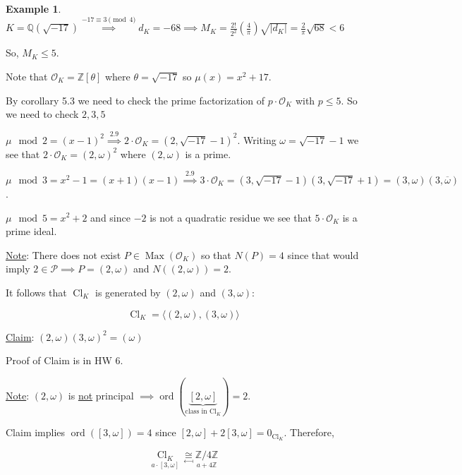 \documentclass[openany]{amsbook}
\numberwithin{section}{chapter}
\theoremstyle{definition}
\newtheorem*{example}{Example}
\begin{document}
\begin{example}
    \(K = \mathbb{Q}(\sqrt{-17}) \overset{-17 \equiv 3\pmod 4}{\implies} d_K = -68 \implies M_K = \frac{2!}{2^2} \left( \frac{4}{\pi} \right) \sqrt{\vert d_K \vert } = \frac{2}{\pi }\sqrt{68} < 6 \) 

    So, \(M_K \leq 5\). 

    Note that \(\mathcal{O}_K = \mathbb{Z} [\theta]\) where \(\theta = \sqrt{-17}\) so \(\mu(x) = x^2 + 17\). 
    
    By corollary 5.3 we need to check the prime factorization of \(p\cdot \mathcal{O}_K\) with \(p \leq 5\). So we need to check \(2,3,5\) 
    
    \(\mu \mod 2 = (x-1)^2 \overset{2.9}{\implies} 2\cdot \mathcal{O}_K = (2,\sqrt{-17}-1)^2\). Writing \(\omega = \sqrt{-17} - 1\) we see that \(2\cdot \mathcal{O}_K = (2,\omega)^2\) where \((2,\omega)\) is a prime.
    
    \(\mu \mod 3 = x^2 - 1 = (x+1)(x-1) \overset{2.9}{\implies} 3\cdot \mathcal{O}_K = (3,\sqrt{-17}-1)(3,\sqrt{-17}+1) = (3,\omega)(3,\overline{\omega})\).
    
    \(\mu \mod 5 = x^2 + 2\) and since \(-2\) is not a quadratic residue we see that \(5\cdot \mathcal{O}_K\) is a prime ideal. 

    \underline{Note}: There does not exist \(P\in \operatorname{Max}(\mathcal{O}_K)\) so that \(N(P)=4\) since that would imply \(2\in \mathcal{P} \implies P = (2,\omega)\) and \(N((2,\omega)) = 2\).  

    It follows that \(\operatorname{Cl}_K\) is generated by \((2,\omega)\) and \((3,\omega)\):

    \[
        \operatorname{Cl}_K = \langle (2,\omega), (3,\omega) \rangle 
    \]

    \underline{Claim}: \((2,\omega)(3,\omega)^2 = (\omega)\)
    
    Proof of Claim is in HW 6.

    \underline{Note}: \((2,\omega)\) is \underline{not} principal \(\implies \operatorname{ord}(\underbrace{[2,\omega]}_{\text{class in }\operatorname{Cl}_K}) = 2\).

    Claim implies \(\operatorname{ord}([3,\omega]) = 4\) since \([2,\omega] + 2 [3,\omega] = 0_{\operatorname{Cl}_K}\). Therefore,

    \[
        \underset{a\cdot [3,\omega]}{\operatorname{Cl}_K} \underset{\mapsfrom}{\cong} \underset{a + 4\mathbb{Z}}{\mathbb{Z} / 4\mathbb{Z}}  
    \]

\end{example}
\end{document}
